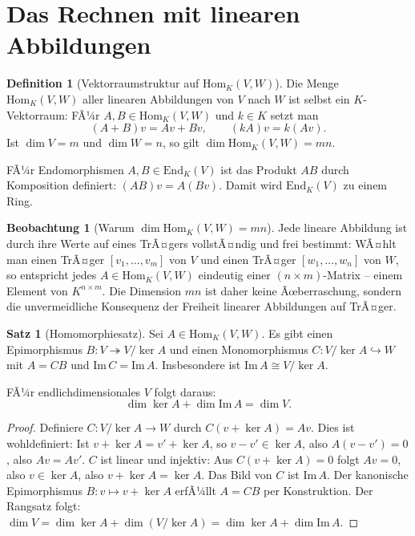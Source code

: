 ﻿\documentclass[a4paper,12pt]{report}
\theoremstyle{definition}
\newtheorem{definition}{Definition}
\newtheorem{satz}{Satz}
\newtheorem{beobachtung}{Beobachtung}
\begin{document}
\section{Das Rechnen mit linearen Abbildungen}

\begin{definition}[Vektorraumstruktur auf \texorpdfstring{$\mathrm{Hom}_K(V,W)$}{Hom_K(V,W)}]
    Die Menge $\mathrm{Hom}_K(V, W)$ aller linearen Abbildungen von $V$
    nach $W$ ist selbst ein $K$-Vektorraum: FÃ¼r $A, B \in \mathrm{Hom}_K(V,W)$
    und $k \in K$ setzt man
    \[
        (A + B)v = Av + Bv, \qquad (kA)v = k(Av).
    \]
    Ist $\dim V = m$ und $\dim W = n$, so gilt
    $\dim \mathrm{Hom}_K(V, W) = mn$.

    FÃ¼r Endomorphismen $A, B \in \mathrm{End}_K(V)$ ist das Produkt
    $AB$ durch Komposition definiert: $(AB)v = A(Bv)$. Damit wird
    $\mathrm{End}_K(V)$ zu einem Ring.
\end{definition}

\begin{beobachtung}[Warum \texorpdfstring{$\dim \mathrm{Hom}_K(V,W) = mn$}{ Hom_K(V,W) = mn}]
    Jede lineare Abbildung ist durch ihre Werte auf eines TrÃ¤gers vollstÃ¤ndig
    und frei bestimmt: WÃ¤hlt man einen TrÃ¤ger $[v_1, \dots, v_m]$ von $V$
    und einen TrÃ¤ger $[w_1, \dots, w_n]$ von $W$, so entspricht jedes
    $A \in \mathrm{Hom}_K(V,W)$ eindeutig einer $(n \times m)$-Matrix --
    einem Element von $K^{n \times m}$. Die Dimension $mn$ ist daher
    keine Ãœberraschung, sondern die unvermeidliche Konsequenz der Freiheit
    linearer Abbildungen auf TrÃ¤ger.
\end{beobachtung}

\begin{satz}[Homomorphiesatz]
    Sei $A \in \mathrm{Hom}_K(V, W)$. Es gibt einen Epimorphismus
    $B : V \twoheadrightarrow V/\ker A$ und einen Monomorphismus
    $C : V/\ker A \hookrightarrow W$ mit $A = CB$ und
    $\mathrm{Im}\, C = \mathrm{Im}\, A$. Insbesondere ist
    $\mathrm{Im}\, A \cong V / \ker A$.

    FÃ¼r endlichdimensionales $V$ folgt daraus:
    \[
        \dim \ker A + \dim \mathrm{Im}\, A = \dim V.
    \]
\end{satz}
\begin{proof}
    Definiere $C : V/\ker A \to W$ durch $C(v + \ker A) = Av$.
    Dies ist wohldefiniert: Ist $v + \ker A = v' + \ker A$, so $v - v' \in \ker A$,
    also $A(v - v') = 0$, also $Av = Av'$.
    $C$ ist linear und injektiv: Aus $C(v + \ker A) = 0$ folgt $Av = 0$,
    also $v \in \ker A$, also $v + \ker A = \ker A$. Das Bild von $C$
    ist $\mathrm{Im}\, A$. Der kanonische Epimorphismus $B : v \mapsto v + \ker A$
    erfÃ¼llt $A = CB$ per Konstruktion.
    Der Rangsatz folgt: $\dim V = \dim \ker A + \dim(V/\ker A) = \dim \ker A + \dim \mathrm{Im}\, A$.
\end{proof}
\end{document}
